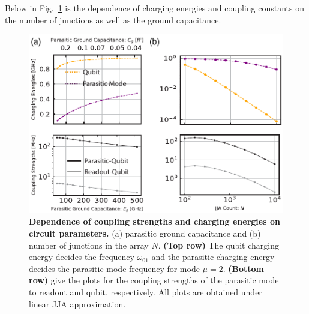 \documentclass[%
reprint,
superscriptaddress,
 amsmath,amssymb,
 aps,
 prx,
longbibliography,
floatfix,
]{revtex4-2}
\begin{document}
Below in Fig.~\ref{fig:circuit_comp} is the dependence of charging energies and coupling constants on the number of junctions as well as the ground capacitance.
\begin{figure}
    \centering
    \includegraphics[width=\linewidth]{Supp_Fig/Circuit_comp.pdf}
    \caption{{\bf Dependence of coupling strengths and charging energies on circuit parameters.} (a) parasitic ground capacitance and (b) number of junctions in the array $N$. {\bf (Top row)} The qubit charging energy decides the frequency $\omega_{01}$ and the parasitic charging energy decides the parasitic mode frequency for mode $\mu=2$. {\bf (Bottom row)} give the plots for the coupling strengths of the parasitic mode to readout and qubit, respectively. All plots are obtained under linear JJA approximation.}
    \label{fig:circuit_comp}
\end{figure}
\end{document}
